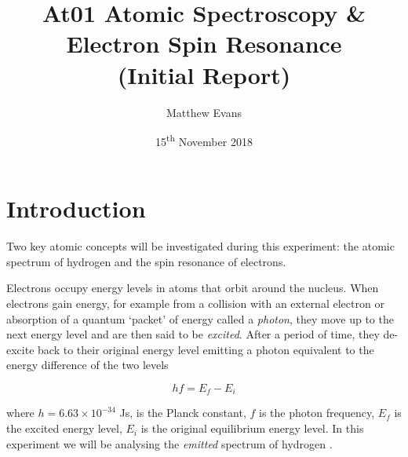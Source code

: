\documentclass{article}
\begin{document}
\title{At01 Atomic Spectroscopy \& Electron Spin Resonance \\ \large{(Initial Report)}} %
\author{Matthew Evans}%
\date{15\textsuperscript{th} November 2018} %
\maketitle %



\section{Introduction}
\label{sec:introduction}

Two key atomic concepts will be investigated during this experiment: the atomic spectrum of hydrogen and the spin resonance of electrons. %

\vspace{2mm}
\noindent
Electrons occupy energy levels in atoms that orbit around the nucleus. When electrons gain energy, for example from a collision with an external electron or absorption of a quantum  `packet' of energy called a \textit{photon}, they move up to the next energy level and are then said to be \textit{excited}. After a  period of time, they de-excite back to their original energy level emitting a photon equivalent to the energy difference of the two levels 

\begin{equation}
\label{eq:energy-diff}
hf = E_f - E_i
\end{equation}

\vspace{2mm}
\noindent
where $h = 6.63 \times 10^{-34}$ Js, is the Planck constant, $f$ is the photon frequency, $E_f$ is the excited energy level, $E_i$ is the original equilibrium energy level. %
In this experiment we will be analysing the \textit{emitted} spectrum of hydrogen \cite{Paper01}.
\end{document}

